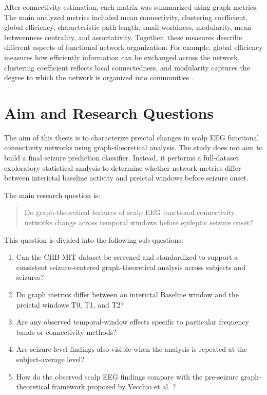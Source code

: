 After connectivity estimation, each matrix was summarized using graph metrics.
The main analyzed metrics included mean connectivity, clustering coefficient,
global efficiency, characteristic path length, small-worldness, modularity, mean
betweenness centrality, and assortativity. Together, these measures describe
different aspects of functional network organization. For example, global
efficiency measures how efficiently information can be exchanged across the
network, clustering coefficient reflects local connectedness, and modularity
captures the degree to which the network is organized into communities
\cite{Rubinov2010}.

\section{Aim and Research Questions}
\label{sec:introduction-aim-research-questions}

The aim of this thesis is to characterize preictal changes in scalp EEG
functional connectivity networks using graph-theoretical analysis. The study
does not aim to build a final seizure prediction classifier. Instead, it
performs a full-dataset exploratory statistical analysis to determine whether
network metrics differ between interictal baseline activity and preictal
windows before seizure onset.

The main research question is:

\begin{quote}
    Do graph-theoretical features of scalp EEG functional connectivity networks
    change across temporal windows before epileptic seizure onset?
\end{quote}

This question is divided into the following sub-questions:

\begin{enumerate}
    \item Can the CHB-MIT dataset be screened and standardized to support a
    consistent seizure-centered graph-theoretical analysis across subjects and
    seizures?

    \item Do graph metrics differ between an interictal Baseline window and the
    preictal windows T0, T1, and T2?

    \item Are any observed temporal-window effects specific to particular
    frequency bands or connectivity methods?

    \item Are seizure-level findings also visible when the analysis is repeated
    at the subject-average level?

    \item How do the observed scalp EEG findings compare with the pre-seizure
    graph-theoretical framework proposed by Vecchio et al. \cite{Vecchio2016}?
\end{enumerate}

